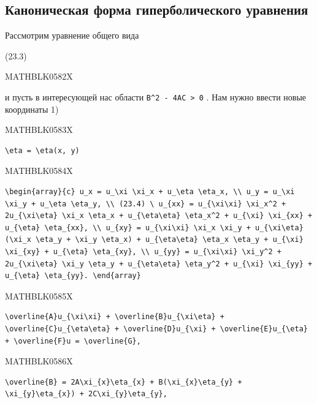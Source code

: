 \documentclass[
  ukrainian,
]{article}
\begin{document}
\subsection{Каноническая форма гиперболического
уравнения}\label{ux43aux430ux43dux43eux43dux438ux447ux435ux441ux43aux430ux44f-ux444ux43eux440ux43cux430-ux433ux438ux43fux435ux440ux431ux43eux43bux438ux447ux435ux441ux43aux43eux433ux43e-ux443ux440ux430ux432ux43dux435ux43dux438ux44f}

Рассмотрим уравнение общего вида

(23.3)

MATHBLK0582X

и пусть в интересующей нас области
\texttt{B\^{}2\ -\ 4AC\ \textgreater{}\ 0} . Нам нужно ввести новые
координаты 1)

MATHBLK0583X

\begin{verbatim}
\eta = \eta(x, y)
\end{verbatim}

MATHBLK0584X

\begin{verbatim}
\begin{array}{c} u_x = u_\xi \xi_x + u_\eta \eta_x, \\ u_y = u_\xi \xi_y + u_\eta \eta_y, \\ (23.4) \ u_{xx} = u_{\xi\xi} \xi_x^2 + 2u_{\xi\eta} \xi_x \eta_x + u_{\eta\eta} \eta_x^2 + u_{\xi} \xi_{xx} + u_{\eta} \eta_{xx}, \\ u_{xy} = u_{\xi\xi} \xi_x \xi_y + u_{\xi\eta} (\xi_x \eta_y + \xi_y \eta_x) + u_{\eta\eta} \eta_x \eta_y + u_{\xi} \xi_{xy} + u_{\eta} \eta_{xy}, \\ u_{yy} = u_{\xi\xi} \xi_y^2 + 2u_{\xi\eta} \xi_y \eta_y + u_{\eta\eta} \eta_y^2 + u_{\xi} \xi_{yy} + u_{\eta} \eta_{yy}. \end{array}
\end{verbatim}

MATHBLK0585X

\begin{verbatim}
\overline{A}u_{\xi\xi} + \overline{B}u_{\xi\eta} + \overline{C}u_{\eta\eta} + \overline{D}u_{\xi} + \overline{E}u_{\eta} + \overline{F}u = \overline{G},
\end{verbatim}

MATHBLK0586X

\begin{verbatim}
\overline{B} = 2A\xi_{x}\eta_{x} + B(\xi_{x}\eta_{y} + \xi_{y}\eta_{x}) + 2C\xi_{y}\eta_{y},
\end{verbatim}
\end{document}
